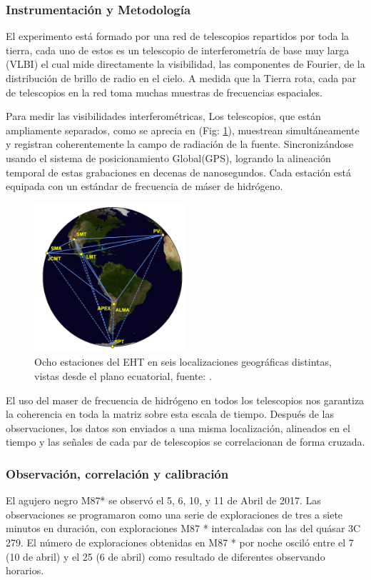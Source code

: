 \documentclass{article}
\begin{document}
\subsubsection{Instrumentación y Metodología}
El experimento está formado por una red de telescopios repartidos por toda la tierra, cada uno de estos es un telescopio de interferometría de base muy larga (VLBI) el cual mide directamente la visibilidad, las componentes de Fourier, de la distribución de brillo de radio en el cielo. A medida que la Tierra rota, cada par de telescopios en la red toma muchas muestras de frecuencias espaciales.\cite{event2019firstI}

Para medir las visibilidades interferométricas, Los telescopios, que están ampliamente separados, como se aprecia en (Fig: \ref{fig:EHT}), muestrean simultáneamente y registran coherentemente la campo de radiación de la fuente. Sincronizándose usando el sistema de posicionamiento Global(GPS), logrando la alineación temporal de estas grabaciones en decenas de nanosegundos. Cada estación está equipada con un estándar de frecuencia de máser de hidrógeno.\cite{event2019firstI}

\begin{figure}[H]
    \centering
    \includegraphics[width=0.5\textwidth]{EHT.png}
    \caption{Ocho estaciones del EHT en seis localizaciones geográficas distintas, vistas desde el plano ecuatorial, fuente: \cite{event2019firstI}.}
    \label{fig:EHT}
\end{figure}

El uso del maser de frecuencia de hidrógeno en todos los telescopios nos garantiza la coherencia en toda la matriz sobre esta escala de tiempo. Después de las observaciones, los datos son enviados a una misma localización, alineados en el tiempo y las señales de cada par de telescopios se correlacionan de forma cruzada.\cite{event2019firstI}

\subsubsection{Observación, correlación y calibración}
El agujero negro M87* se observó el 5, 6, 10, y 11 de Abril de 2017. Las observaciones se programaron como una serie de exploraciones de tres a siete minutos en duración, con exploraciones M87 * intercaladas con las del quásar 3C 279. El número de exploraciones obtenidas en M87 * por noche osciló entre el 7 (10 de abril) y el 25 (6 de abril) como resultado de diferentes observando horarios. \cite{event2019firstI}
\end{document}
